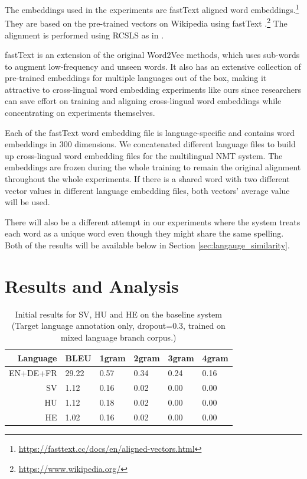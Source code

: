 \documentclass[thesis,fonts=libertine]{cluu}
\begin{document}
The embeddings used in the experiments are fastText aligned word embeddings.\footnote{\url{https://fasttext.cc/docs/en/aligned-vectors.html}} They are based on the pre-trained vectors on Wikipedia using fastText \parencite{Bojanowski:2016aa}.\footnote{\url{https://www.wikipedia.org/}} The alignment is performed using RCSLS as in \textcite{Joulin:2018aa}.

fastText is an extension of the original Word2Vec methods, which uses sub-words to augment low-frequency and unseen words. It also has an extensive collection of pre-trained embeddings for multiple languages out of the box, making it attractive to cross-lingual word embedding experiments like ours since researchers can save effort on training and aligning cross-lingual word embeddings while concentrating on experiments themselves.

Each of the fastText word embedding file is language-specific and contains word embeddings in 300 dimensions. We concatenated different language files to build up cross-lingual word embedding files for the multilingual NMT system. The embeddings are frozen during the whole training to remain the original alignment throughout the whole experiments. If there is a shared word with two different vector values in different language embedding files, both vectors' average value will be used.

There will also be a different attempt in our experiments where the system treats each word as a unique word even though they might share the same spelling. Both of the results will be available below in Section \ref{sec:langauge_similarity}.


\chapter{Results and Analysis}
\label{chap:results}

\begin{table}
  \centering
  \begin{tabular}{r|*{5}{l}}
    \hline
    \textbf{Language} & \textbf{BLEU} & \textbf{1gram} & \textbf{2gram} & \textbf{3gram} & \textbf{4gram} \\ [0.25ex]
    \hline\hline
    EN+DE+FR & 29.22 & 0.57 & 0.34 & 0.24 & 0.16 \\
    SV & 1.12 & 0.16 & 0.02 & 0.00 & 0.00 \\ 
    HU & 1.12 & 0.18 & 0.02 & 0.00 & 0.00 \\
    HE & 1.02 & 0.16 & 0.02 & 0.00 & 0.00 \\
    \hline
  \end{tabular}
  \caption{Initial results for SV, HU and HE on the baseline system (Target language annotation only, dropout=0.3, trained on mixed language branch corpus.)}
  \label{table:initial_results}
\end{table}
\end{document}
